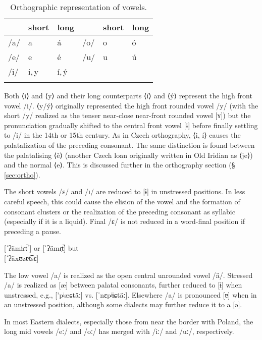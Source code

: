 \begin{table}
	\footnotesize\sffamily
	\caption{Orthographic representation of vowels.}
	\medskip
	\begin{tabularx}{0.7\textwidth}{@{}YYYYYY@{}}
		\toprule
		& {\sc short} & {\sc long} & & {\sc short} & {\sc long}\\
		\midrule
		/a/ & a 	&á 			& /o/ 	& o &ó \\
		/e/ & e 	&é 			& /u/ 	& u &ú\\
		/i/ & i,\,y &í,\,\'y 	& 		& 	&\\
		\bottomrule
		\label{table:vowels-orth}
	\end{tabularx}
\end{table}

Both ⟨i⟩ and ⟨y⟩ and their long counterparts ⟨í⟩ and ⟨ý⟩ represent the high
front vowel /i/. ⟨y/ý⟩ originally represented the high front rounded vowel /y/
(with the short /y/ realized as the tenser near-close near-front rounded vowel
[ʏ]) but the pronunciation gradually shifted to the central front vowel [ɨ]
before finally settling to /i/ in the 14th or 15th century. As in
Czech orthography, ⟨i, í⟩ causes the palatalization of the
preceding consonant. The same distinction is found between the palatalising ⟨ě⟩
(another Czech loan originally written in Old Iridian as ⟨je⟩) and the normal
⟨e⟩. This is discussed further in the orthography section (\S\,\ref{sec:ortho}).

The short vowels /ɛ/ and /ɪ/ are reduced to [ɨ] in unstressed positions. In less
careful speech, this could cause the elision of the vowel and the formation of
consonant clusters or the realization of the preceding consonant as syllabic
(especially if it is a liquid). Final /ɛ/ is not reduced in a word-final
position if preceding a pause.

\ex
	 [ˈʔämɨɾt̚ ] or [ˈʔämɾ̩t̚] but\\
	 [ˈʔäxʊzɐt͡sɛ]
\xe

The low vowel /a/ is realized as the open central unrounded vowel /\"a/.
Stressed /a/ is realized as [\ae] between palatal consonants, further reduced to
[ɨ] when unstressed, e.g.,  ['pʲæɕtäː] vs. 
[ˈnɛpʲɨɕtäː]. Elsewhere /a/ is pronounced [ɐ] when in an unstressed position,
although some dialects may further reduce it to a [ə].

In most Eastern dialects, especially those from near the border with Poland, the
long mid vowels /eː/ and /oː/ has merged with /iː/ and /uː/, respectively.

